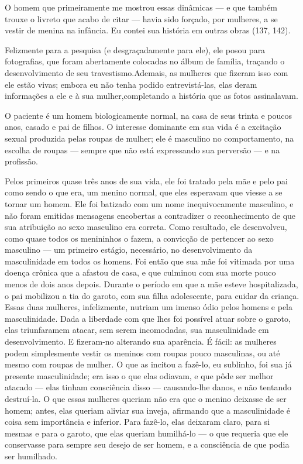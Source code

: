 O homem que primeiramente me mostrou essas dinâmicas --- e que
também trouxe o livreto que acabo de citar --- havia sido forçado, por
mulheres, a se vestir de menina na infância. Eu contei sua história em
outras obras (137, 142).

Felizmente para a pesquisa (e desgraçadamente para ele), ele posou
para fotografias, que foram abertamente colocadas no álbum de família,
traçando o desenvolvimento de seu travestismo.\idxmascuhum[|(] Ademais, as mulheres que
fizeram isso com ele estão vivas; embora eu não tenha podido
entrevistá-las, elas deram informações a ele e à sua mulher,\idxtravemporn[|)]
completando a história que as fotos assinalavam.

O paciente é um homem biologicamente normal, na casa de seus trinta
e poucos anos, casado e pai de filhos. O interesse dominante em sua
vida é a excitação sexual produzida pelas roupas de mulher; ele é
masculino\idxmascu{} no comportamento, na escolha de roupas --- sempre que não
está expressando sua perversão --- e na profissão.

Pelos primeiros quase três anos de sua vida, ele foi tratado pela
mãe e pelo pai como sendo o que era, um menino normal, que eles
esperavam que viesse a se tornar um homem. Ele foi batizado com um nome
inequivocamente masculino, e não foram emitidas mensagens encobertas a
contradizer o reconhecimento de que sua atribuição ao sexo masculino
era correta. Como resultado, ele desenvolveu, como quase todos os
menininhos o fazem, a convicção de pertencer ao sexo masculino --- um
primeiro estágio, necessário, no desenvolvimento da masculinidade em
todos os homens. Foi então que sua mãe foi vitimada por uma doença
crônica que a afastou de casa, e que culminou com sua morte pouco menos
de dois anos depois. Durante o período em que a mãe esteve
hospitalizada, o pai mobilizou a tia do garoto, com sua filha
adolescente, para cuidar da criança. Essas duas mulheres, infelizmente,
nutriam um imenso ódio pelos homens e pela masculinidade.\idxtraumatrae{} Dada a
liberdade com que lhes foi possível atuar sobre o garoto, elas
triunfaram\idxtraumatrav[|(] em atacar, sem serem incomodadas, sua masculinidade em
desenvolvimento. E fizeram-no alterando sua aparência. É fácil: as
mulheres podem simplesmente vestir os meninos com roupas pouco
masculinas, ou até mesmo com roupas de mulher. O que as incitou a
fazê-lo, eu sublinho, foi sua já presente masculinidade; era isso o que
elas odiavam, e que pôde ser melhor atacado --- elas tinham
consciência disso --- causando-lhe danos, e não tentando destruí-la. O
que essas mulheres queriam não era que o menino deixasse de ser homem;
antes, elas queriam aliviar sua inveja, afirmando que a masculinidade é
coisa sem importância e inferior. Para fazê-lo, elas deixaram claro,
para si mesmas e para o garoto, que elas queriam humilhá-lo\idxtravemhumi{} --- o que
requeria que ele conservasse para sempre seu desejo de ser homem, e a
consciência de que podia ser humilhado.

